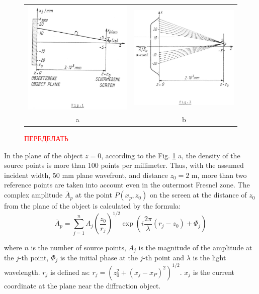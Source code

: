 \documentclass{aip-cp}
\begin{document}
\begin{figure}
\begin{tabular}{cc}
    {\includegraphics[width=160pt]{figures/fig1.png}}
    &{\includegraphics[width=160pt]{figures/fig3.png}}\\ a&b
\end{tabular}
\caption{\textcolor{red}{ПЕРЕДЕЛАТЬ}}
\label{Formulation}
\end{figure}

In the plane of the object $z=0$, according to the Fig. \ref{Formulation} a, the density of the source points is more than 100 points per millimeter. Thus, with the assumed incident width, 50 mm plane wavefront, and distance $z_0 = 2$ m, more than two reference points are taken into account even in the outermost Fresnel zone. The complex amplitude $\overline{A}_p$ at the point $P{(x_p, z_0)}$ on the screen at the distance of $z_0$ from the plane of the object is calculated by the formula:
\begin{equation}
\overline{A}_p = \sum_{j=1}^{n} A_j \left(\frac{z_0}{r_j} \right)^{1/2} \exp \left(i \frac{2\pi}{\lambda} \left(r_j - z_0\right) + \Phi_j\right)
\end{equation}

where $n$ is the number of source points, $A_j$ is the magnitude of the amplitude at the $j$-th point, $\Phi_j$ is the initial phase at the $j$-th point and $\lambda$ is the light wavelength. $r_j$ is  defined as: $r_j = \left(z_0^2 + \left(x_j - x_P\right)^2\right)^{1/2}$. $x_j$ is the current coordinate at the plane near the diffraction object.
\end{document}
